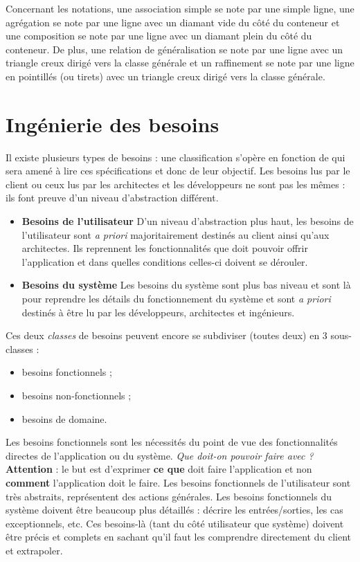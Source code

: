 \documentclass{article}
\begin{document}
			Concernant les notations, une association simple se note par une simple ligne, une agrégation se note par une ligne avec un diamant vide du côté du conteneur et une composition
			se note par une ligne avec un diamant plein du côté du conteneur. De plus, une relation de généralisation se note par une ligne avec un triangle creux dirigé vers la classe générale
			et un raffinement se note par une ligne en pointillés (ou tirets) avec un triangle creux dirigé vers la classe générale.

\section{Ingénierie des besoins}
	Il existe plusieurs types de besoins : une classification s'opère en fonction de qui sera amené à lire ces spécifications et donc de leur objectif. Les besoins lus par le client ou ceux
	lus par les architectes et les développeurs ne sont pas les mêmes : ils font preuve d'un niveau d'abstraction différent.

	\begin{itemize}
		\item \textbf{Besoins de l'utilisateur} D'un niveau d'abstraction plus haut, les besoins de l'utilisateur sont \textit{a priori} majoritairement destinés au client ainsi qu'aux architectes.
			Ils reprennent les fonctionnalités que doit pouvoir offrir l'application et dans quelles conditions celles-ci doivent se dérouler.
		\item \textbf{Besoins du système} Les besoins du système sont plus bas niveau et sont là pour reprendre les détails du fonctionnement du système et sont \textit{a priori} destinés à être
			lu par les développeurs, architectes et ingénieurs.
	\end{itemize}

	Ces deux \textit{classes} de besoins peuvent encore se subdiviser (toutes deux) en 3 sous-classes :

	\begin{itemize}
		\item besoins fonctionnels ;
		\item besoins non-fonctionnels ;
		\item besoins de domaine.
	\end{itemize}

	Les besoins fonctionnels sont les nécessités du point de vue des fonctionnalités directes de l'application ou du système. \textit{Que doit-on pouvoir faire avec ?} \textbf{Attention} : le
	but est d'exprimer \textbf{ce que} doit faire l'application et non \textbf{comment} l'application doit le faire. Les besoins fonctionnels de l'utilisateur sont très abstraits, représentent
	des actions générales. Les besoins fonctionnels du système doivent être beaucoup plus détaillés : décrire les entrées/sorties, les cas exceptionnels, etc. Ces besoins-là (tant du côté
	utilisateur que système) doivent être précis et complets en sachant qu'il faut les comprendre directement du client et extrapoler.
\end{document}
